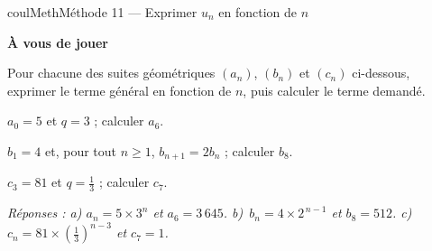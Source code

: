 \documentclass[11pt,a4paper]{article}
\makeatletter
\renewcommand{\ge}{\geqslant}
\newcounter{lycee@signet}
\newcommand{\signet}[3][]{\stepcounter{lycee@signet}%
  \edef\lycee@dest{\if\relax\detokenize{#1}\relax
    signet.\arabic{lycee@signet}\else#1\fi}%
  \hypertarget{\lycee@dest}{}\bookmark[level=#2,dest=\lycee@dest]{#3}}
\newcounter{methode}
\newenvironment{methodebox}[1][Méthode]{\stepcounter{methode}%
  \begin{boitecours}[phantom={\signet[methode-\arabic{methode}]{2}{#1}}]{coulMeth}{#1}}%
  {\end{boitecours}}
\newcommand{\etape}[1]{\par\smallskip\textbf{\color{coulMeth}#1}\par\nobreak\smallskip}
\newcommand{\reponse}[1]{\par\smallskip
  {\footnotesize\itshape\color{black!55}Réponses : #1}}
\makeatother
\begin{document}
\begin{methodebox}[Méthode 11 --- Exprimer $u_{n}$ en fonction de $n$]
\etape{À vous de jouer}
Pour chacune des suites géométriques $(a_{n})$, $(b_{n})$ et $(c_{n})$ ci-dessous, exprimer
le terme général en fonction de $n$, puis calculer le terme demandé.
\begin{questions}[label=\alph*)]
  \item $a_{0}=5$ et $q=3$ ; calculer $a_{6}$.
  \item $b_{1}=4$ et, pour tout $n\ge 1$, $b_{n+1}=2b_{n}$ ; calculer $b_{8}$.
  \item $c_{3}=81$ et $q=\frac{1}{3}$ ; calculer $c_{7}$.
\end{questions}
\reponse{a) $a_{n}=5\times 3^{n}$ et $a_{6}=3\,645$.\; b)~$b_{n}=4\times 2^{\,n-1}$ et
$b_{8}=512$.\; c)~$c_{n}=81\times\left(\frac{1}{3}\right)^{n-3}$ et $c_{7}=1$.}
\end{methodebox}
\end{document}

